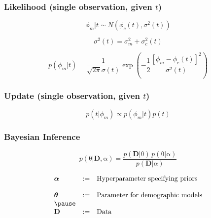 \documentclass{beamer}
\newcommand{\greekbf}[1]{\boldsymbol{\mathrm{#1}}}
\begin{document}
\begin{frame}[t]
  \frametitle{Likelihood (single observation, given $t$)}
  \Large
  \begin{equation}
    \phi_m|t \sim N(\phi_c(t),\sigma^2(t))
  \end{equation}
  
  \bigskip
  
  \begin{equation}
    \sigma^2(t) = \sigma^2_m + \sigma^2_c(t)
  \end{equation}
  
  \bigskip
  
  \begin{equation}
    p(\phi_m|t) = \frac{1}{\sqrt{2\pi}\sigma(t)}\exp{(-\frac{1}{2}\frac{[\phi_m-\phi_c(t)]^2}{\sigma^2(t)})}
  \end{equation}
 
  \normalsize
\end{frame}

\begin{frame}[t]
  \frametitle{Update (single observation, given $t$)}
  \Large
  \begin{equation}
    p(t|\phi_m) \propto p(\phi_m|t) p(t)
  \end{equation}
  \normalsize
\end{frame}

\begin{frame}
  \frametitle{Bayesian Inference}
  \begin{center}
	\begin{equation*}
          p(\greekbf{\theta}|\mathbf{D},\greekbf{\alpha}) = \frac{p(\mathbf{D}|\greekbf{\theta}) \, p(\greekbf{\theta}|\greekbf{\alpha})}{p(\mathbf{D}|\greekbf{\alpha})}
        \end{equation*}
  \end{center}

  \pause
  \begin{center}
          \begin{equation*}
            \begin{array}{lll}
	      \greekbf{\alpha} & := & \mbox{Hyperparameter specifying priors}\\
                               &    &\\
              \greekbf{\theta} & := & \mbox{Parameter for demographic models}\\
	      \pause
                               &    &\\
              \mathbf{D}       & := & \mbox{Data}\\
                               &    &\\
            \end{array}
          \end{equation*}
  \end{center}
\end{frame}
\end{document}
